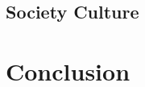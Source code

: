 \documentclass{scrartcl}
\begin{document}
\subsection{Society Culture}

\section{Conclusion}
\end{document}
